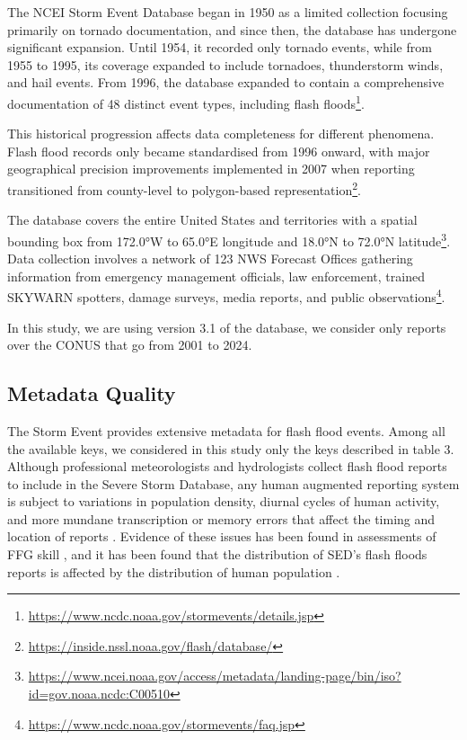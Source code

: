 The NCEI Storm Event Database began in 1950 as a limited collection focusing primarily on tornado documentation, and since then, the database has undergone significant expansion. Until 1954, it recorded only tornado events, while from 1955 to 1995, its coverage expanded to include tornadoes, thunderstorm winds, and hail events. From 1996, the database expanded to contain a comprehensive documentation of 48 distinct event types, including flash floods\footnote{\url{https://www.ncdc.noaa.gov/stormevents/details.jsp}}. 

This historical progression affects data completeness for different phenomena. Flash flood records only became standardised from 1996 onward, with major geographical precision improvements implemented in 2007 when reporting transitioned from county-level to polygon-based representation\footnote{\url{https://inside.nssl.noaa.gov/flash/database/}}.

The database covers the entire United States and territories with a spatial bounding box from 172.0°W to 65.0°E longitude and 18.0°N to 72.0°N latitude\footnote{\url{https://www.ncei.noaa.gov/access/metadata/landing-page/bin/iso?id=gov.noaa.ncdc:C00510}}. Data collection involves a network of 123 NWS Forecast Offices gathering information from emergency management officials, law enforcement, trained SKYWARN spotters, damage surveys, media reports, and public observations\footnote{\url{https://www.ncdc.noaa.gov/stormevents/faq.jsp}}.

In this study, we are using version 3.1 of the database, we consider only reports over the CONUS that go from 2001 to 2024.


\subsection{Metadata Quality}

The Storm Event provides extensive metadata for flash flood events. Among all the available keys, we considered in this study only the keys described in table 3. Although professional meteorologists and hydrologists collect flash flood reports to include in the Severe Storm Database, any human augmented reporting system is subject to variations in population density, diurnal cycles of human activity, and more mundane transcription or memory errors that affect the timing and location of reports \citep{Barthold_2015}. Evidence of these issues has been found in assessments of FFG skill \citep{Clark_2014}, and it has been found that the distribution of SED's flash floods reports is affected by the distribution of human population \cite{Marjerison_2016}. 

